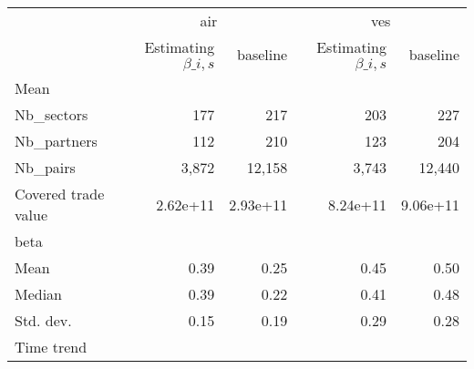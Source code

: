 \begin{tabular}{lllll}
\cline{1-5}
\multicolumn{1}{c}{} &
  \multicolumn{2}{|c}{air} &
  \multicolumn{2}{c}{ves} \\
\multicolumn{1}{c}{} &
  \multicolumn{1}{|r}{Estimating $\beta\_{i,s}$} &
  \multicolumn{1}{r}{baseline} &
  \multicolumn{1}{r}{Estimating $\beta\_{i,s}$} &
  \multicolumn{1}{r}{baseline} \\
\cline{1-5}
\multicolumn{1}{l}{Mean} &
  \multicolumn{1}{|r}{} &
  \multicolumn{1}{r}{} &
  \multicolumn{1}{r}{} &
  \multicolumn{1}{r}{} \\
\multicolumn{1}{l}{\hspace{1em}Nb\_sectors} &
  \multicolumn{1}{|r}{177} &
  \multicolumn{1}{r}{217} &
  \multicolumn{1}{r}{203} &
  \multicolumn{1}{r}{227} \\
\multicolumn{1}{l}{\hspace{1em}Nb\_partners} &
  \multicolumn{1}{|r}{112} &
  \multicolumn{1}{r}{210} &
  \multicolumn{1}{r}{123} &
  \multicolumn{1}{r}{204} \\
\multicolumn{1}{l}{\hspace{1em}Nb\_pairs} &
  \multicolumn{1}{|r}{3,872} &
  \multicolumn{1}{r}{12,158} &
  \multicolumn{1}{r}{3,743} &
  \multicolumn{1}{r}{12,440} \\
\multicolumn{1}{l}{\hspace{1em}Covered trade value} &
  \multicolumn{1}{|r}{2.62e+11} &
  \multicolumn{1}{r}{2.93e+11} &
  \multicolumn{1}{r}{8.24e+11} &
  \multicolumn{1}{r}{9.06e+11} \\
\multicolumn{1}{l}{beta} &
  \multicolumn{1}{|r}{} &
  \multicolumn{1}{r}{} &
  \multicolumn{1}{r}{} &
  \multicolumn{1}{r}{} \\
\multicolumn{1}{l}{\hspace{1em}Mean} &
  \multicolumn{1}{|r}{0.39} &
  \multicolumn{1}{r}{0.25} &
  \multicolumn{1}{r}{0.45} &
  \multicolumn{1}{r}{0.50} \\
\multicolumn{1}{l}{\hspace{1em}Median} &
  \multicolumn{1}{|r}{0.39} &
  \multicolumn{1}{r}{0.22} &
  \multicolumn{1}{r}{0.41} &
  \multicolumn{1}{r}{0.48} \\
\multicolumn{1}{l}{\hspace{1em}Std. dev.} &
  \multicolumn{1}{|r}{0.15} &
  \multicolumn{1}{r}{0.19} &
  \multicolumn{1}{r}{0.29} &
  \multicolumn{1}{r}{0.28} \\
\multicolumn{1}{l}{Time trend} &
  \multicolumn{1}{|r}{} &
  \multicolumn{1}{r}{} &
  \multicolumn{1}{r}{} &

\end{tabular}
